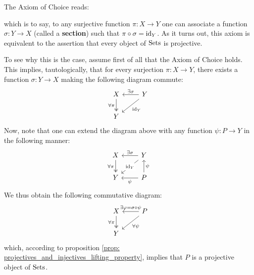                 \begin{remark} \label{remark: all_sets_are_projective}
                    The Axiom of Choice reads:
                        \begin{center}
                        \end{center}
                    which is to say, to any surjective function $\pi: X \to Y$ one can associate a function $\sigma: Y \to X$ (called a \textbf{section}) such that $\pi \circ \sigma = \mathrm{id}_Y$. As it turns out, this axiom is equivalent to the assertion that every object of $\mathrm{Sets}$ is projective. 
                    
                    To see why this is the case, assume first of all that the Axiom of Choice holds. This implies, tautologically, that for every surjection $\pi: X \to Y$, there exists a function $\sigma: Y \to X$ making the following diagram commute:
                        $$
                            \begin{tikzcd}
                            	X & Y \\
                            	Y
                            	\arrow["{\forall \pi}"', two heads, from=1-1, to=2-1]
                            	\arrow["{\id_Y}", from=1-2, to=2-1]
                            	\arrow["{\exists \sigma}"', from=1-2, to=1-1]
                            \end{tikzcd}
                        $$
                    Now, note that one can extend the diagram above with any function $\psi: P \to Y$ in the following manner:
                        $$
                            \begin{tikzcd}
                            	X & Y \\
                            	Y & P
                            	\arrow["{\forall \pi}"', two heads, from=1-1, to=2-1]
                            	\arrow["{\id_Y}"{description}, from=1-2, to=2-1]
                            	\arrow["{\exists \sigma}"', from=1-2, to=1-1]
                            	\arrow["\psi"', from=2-2, to=1-2]
                            	\arrow["\psi", from=2-2, to=2-1]
                            \end{tikzcd}
                        $$
                    We thus obtain the following commutative diagram:
                        $$
                            \begin{tikzcd}
                            	X & P \\
                            	Y
                            	\arrow["{\forall \pi}"', two heads, from=1-1, to=2-1]
                            	\arrow["{\forall \psi}", from=1-2, to=2-1]
                            	\arrow["{\exists \varphi = \sigma \circ \psi}"', from=1-2, to=1-1]
                            \end{tikzcd}
                        $$
                    which, according to proposition \ref{prop: projectives_and_injectives_lifting_property}, implies that $P$ is a projective object of $\mathrm{Sets}$.
                    

\end{remark}
